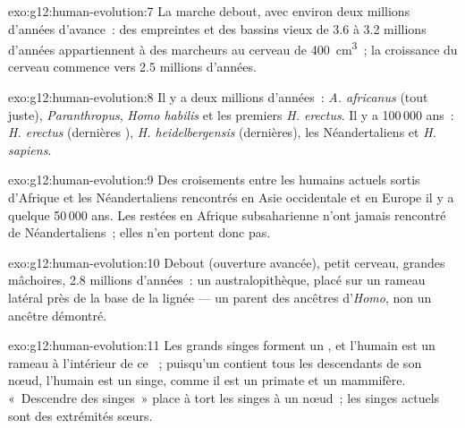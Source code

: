 \begin{solution}{exo:g12:human-evolution:7}
La marche debout, avec environ deux millions d'années d'avance~: des
empreintes et des bassins vieux de 3.6 à 3.2 millions d'années
appartiennent à des marcheurs au cerveau de \qty{400}{cm^3}~; la
croissance du cerveau commence vers 2.5 millions d'années.
\end{solution}

\begin{solution}{exo:g12:human-evolution:8}
Il y a deux millions d'années~: \emph{A. africanus} (tout juste),
\emph{Paranthropus}, \emph{Homo habilis} et les premiers
\emph{H. erectus}. Il y a 100\,000 ans~: \emph{H. erectus} (dernières
), \emph{H. heidelbergensis} (dernières), les
Néandertaliens et \emph{H. sapiens}.
\end{solution}

\begin{solution}{exo:g12:human-evolution:9}
Des croisements entre les humains actuels sortis d'Afrique et les
Néandertaliens rencontrés en Asie occidentale et en Europe il y a
quelque 50\,000 ans. Les  restées en Afrique subsaharienne
n'ont jamais rencontré de Néandertaliens~; elles n'en portent donc
pas.
\end{solution}

\begin{solution}{exo:g12:human-evolution:10}
Debout (ouverture avancée), petit cerveau, grandes mâchoires, 2.8
millions d'années~: un australopithèque, placé sur un rameau latéral
près de la base de la lignée --- un parent des ancêtres d'\emph{Homo},
non un ancêtre démontré.
\end{solution}

\begin{solution}{exo:g12:human-evolution:11}
Les grands singes forment un , et l'humain est un rameau à
l'intérieur de ce ~; puisqu'un  contient tous les
descendants de son nœud, l'humain est un singe, comme il est un
primate et un mammifère. «~Descendre des singes~» place à tort les
singes à un nœud~; les singes actuels sont des extrémités sœurs.
\end{solution}

